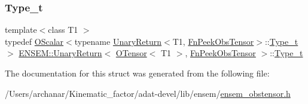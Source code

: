 \subsubsection{\texorpdfstring{Type\_t}{Type\_t}\hspace{0.1cm}{\footnotesize\ttfamily [3/3]}}
{\footnotesize\ttfamily template$<$class T1 $>$ \\
typedef \mbox{\hyperlink{classENSEM_1_1OScalar}{O\+Scalar}}$<$typename \mbox{\hyperlink{structENSEM_1_1UnaryReturn}{Unary\+Return}}$<$T1, \mbox{\hyperlink{structENSEM_1_1FnPeekObsTensor}{Fn\+Peek\+Obs\+Tensor}}$>$\+::\mbox{\hyperlink{structENSEM_1_1UnaryReturn_3_01OTensor_3_01T1_01_4_00_01FnPeekObsTensor_01_4_abefeb4103abe844c4b6cbc2df22fd844}{Type\+\_\+t}}$>$ \mbox{\hyperlink{structENSEM_1_1UnaryReturn}{E\+N\+S\+E\+M\+::\+Unary\+Return}}$<$ \mbox{\hyperlink{classENSEM_1_1OTensor}{O\+Tensor}}$<$ T1 $>$, \mbox{\hyperlink{structENSEM_1_1FnPeekObsTensor}{Fn\+Peek\+Obs\+Tensor}} $>$\+::\mbox{\hyperlink{structENSEM_1_1UnaryReturn_3_01OTensor_3_01T1_01_4_00_01FnPeekObsTensor_01_4_abefeb4103abe844c4b6cbc2df22fd844}{Type\+\_\+t}}}



The documentation for this struct was generated from the following file\+:\begin{DoxyCompactItemize}
\item 
/\+Users/archanar/\+Kinematic\+\_\+factor/adat-\/devel/lib/ensem/\mbox{\hyperlink{adat-devel_2lib_2ensem_2ensem__obstensor_8h}{ensem\+\_\+obstensor.\+h}}\end{DoxyCompactItemize}
